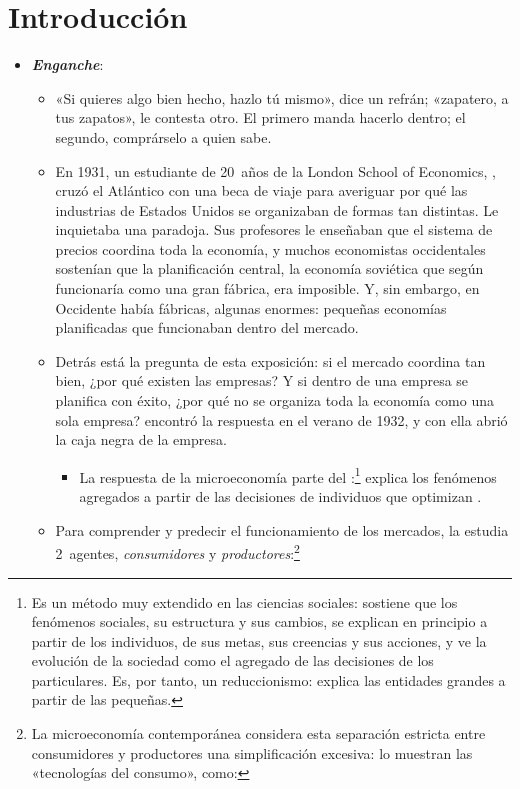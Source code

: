 \documentclass[11pt]{article}
\begin{document}
\tceetitulo

\section*{Introducción}

\begin{itemize}
\item \textbf{\emph{Enganche}}:
  \begin{itemize}
  \item «Si quieres algo bien hecho, hazlo tú mismo», dice un refrán; «zapatero, a tus zapatos», le contesta otro. El primero manda hacerlo dentro; el segundo, comprárselo a quien sabe.
  \item En 1931, un estudiante de 20~años de la London School of Economics, , cruzó el Atlántico con una beca de viaje para averiguar por qué las industrias de Estados Unidos se organizaban de formas tan distintas. Le inquietaba una paradoja. Sus profesores le enseñaban que el sistema de precios coordina toda la economía, y muchos economistas occidentales sostenían que la planificación central, la economía soviética que según  funcionaría como una gran fábrica, era imposible. Y, sin embargo, en Occidente había fábricas, algunas enormes: pequeñas economías planificadas que funcionaban dentro del mercado\nocite{Coase1991Institutional}.
  \item Detrás está la pregunta de esta exposición: si el mercado coordina tan bien, ¿por qué existen las empresas? Y si dentro de una empresa se planifica con éxito, ¿por qué no se organiza toda la economía como una sola empresa?  encontró la respuesta en el verano de 1932, y con ella abrió la caja negra de la empresa.
    \begin{itemize}
    \item La respuesta de la microeconomía parte del :\footnote{Es un método muy extendido en las ciencias sociales: sostiene que los fenómenos sociales, su estructura y sus cambios, se explican en principio a partir de los individuos, de sus metas, sus creencias y sus acciones, y ve la evolución de la sociedad como el agregado de las decisiones de los particulares. Es, por tanto, un reduccionismo: explica las entidades grandes a partir de las pequeñas.} explica los fenómenos agregados a partir de las decisiones de individuos que optimizan .
    \end{itemize}
  \item Para comprender y predecir el funcionamiento de los mercados, la  estudia 2~agentes, \emph{consumidores} y \emph{productores}:\footnote{La microeconomía contemporánea considera esta separación estricta entre consumidores y productores una simplificación excesiva\nocite{EkelundHebert2013History}: lo muestran las «tecnologías del consumo», como:
}
\end{itemize}
\end{itemize}
\end{document}
